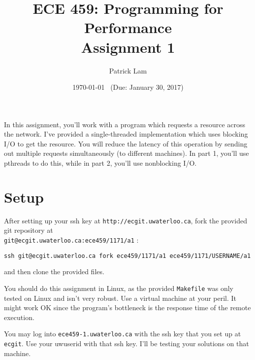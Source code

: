 \documentclass[letterpaper,10pt]{article}
\title{\bf ECE 459: Programming for Performance\\Assignment 1}
\author{Patrick Lam}
\date{\today ~ (Due: January 30, 2017)}
\begin{document}
\maketitle

In this assignment, you'll work with a program which requests a
resource across the network. I've provided 
a single-threaded implementation which uses blocking I/O to get the
resource. You will reduce the latency of this operation by sending out
multiple requests simultaneously (to different machines). In part 1,
you'll use pthreads to do this, while in part 2, you'll use
nonblocking I/O.

\section*{Setup}


After setting up your ssh key at {\tt http://ecgit.uwaterloo.ca}, fork the provided git repository at\\ {\tt git@ecgit.uwaterloo.ca:ece459/1171/a1} : 

\begin{center}
{\tt ssh git@ecgit.uwaterloo.ca fork ece459/1171/a1 ece459/1171/USERNAME/a1}
\end{center}

\noindent and then clone the provided files. %

You should do this assignment in Linux, as the provided {\tt Makefile}
was only tested on Linux and isn't very robust. Use a virtual machine
at your peril. It might work OK since the program's bottleneck is the
response time of the remote execution. 

You may log into {\tt ece459-1.uwaterloo.ca} with the ssh key that you
set up at {\tt ecgit}. Use your uwuserid with
that ssh key. I'll be testing your solutions on that machine.

\end{document}
